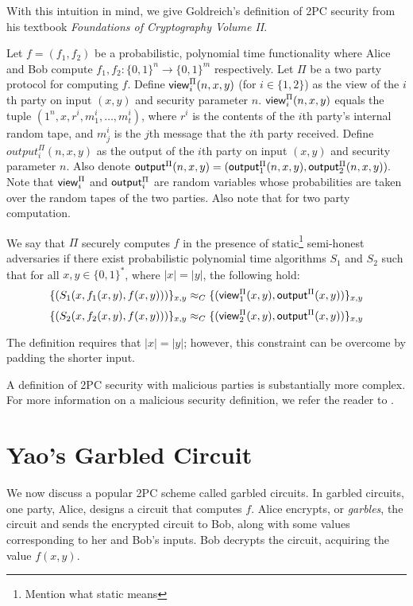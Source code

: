 With this intuition in mind, we give Goldreich's definition of 2PC security from his textbook \textit{Foundations of Cryptography Volume II}\cite{goldreich}.

\begin{definition}
Let $f = (f_1, f_2)$ be a probabilistic, polynomial time functionality where Alice and Bob compute $f_1, f_2: \{0,1\}^n \to \{0,1\}^m$ respectively.
Let $\Pi$ be a two party protocol for computing $f$. 
Define ${\sf view}_i^{\Pi}(n,x,y)$ (for $i \in \{1,2\}$) as the view of the $i$th party on input $(x,y)$ and security parameter $n$.
${\sf view}_i^{\Pi}(n,x,y)$ equals the tuple $(1^n, x, r^i, m_1^i, \ldots, m_t^i)$, where $r^i$ is the contents of the $i$th party's internal random tape, and $m_j^i$ is the $j$th message that the $i$th party received.
Define $output^{\Pi}_i(n,x,y)$ as the output of the $i$th party on input $(x,y)$ and security parameter $n$.
Also denote $ {\sf output}^{\Pi}(n,x,y) = ({\sf output}^{\Pi}_1(n,x,y), {\sf output}^{\Pi}_2(n,x,y)).$
Note that ${\sf view}^{\Pi}_i$ and ${\sf output}^{\Pi}_i$ are random variables whose probabilities are taken over the random tapes of the two parties. Also note that for two party computation.

We say that $\Pi$ securely computes $f$ in the presence of static\footnote{ Mention what static means} semi-honest adversaries if there exist probabilistic polynomial time algorithms $S_1$ and $S_2$ such that for all $x,y \in \{0,1\}^*$, where $|x| = |y|$, the following hold:
\begin{equation} 
    \label{eqn:secdef1}
    \{(S_1(x, f_1(x,y), f(x,y)))\}_{x,y} \approx_C \{({\sf view}^{\Pi}_1(x,y), {\sf output}^{\Pi}(x,y)) \}_{x,y} 
\end{equation}
\begin{equation} 
    \label{eqn:secdef2}
    \{(S_2(x, f_2(x,y), f(x,y)))\}_{x,y} \approx_C \{({\sf view}^{\Pi}_2(x,y), {\sf output}^{\Pi}(x,y)) \}_{x,y} 
\end{equation}
\end{definition}

The definition requires that $|x| = |y|$; however, this constraint can be overcome by padding the shorter input.

A definition of 2PC security with malicious parties is substantially more complex.
For more information on a malicious security definition, we refer the reader to \cite{lindell2009}.

\section{Yao's Garbled Circuit}
We now discuss a popular 2PC scheme called garbled circuits.
In garbled circuits, one party, Alice, designs a circuit that computes $f$.
Alice encrypts, or \textit{garbles}, the circuit and sends the encrypted circuit to Bob, along with some values corresponding to her and Bob's inputs.
Bob decrypts the circuit, acquiring the value $f(x,y)$.

